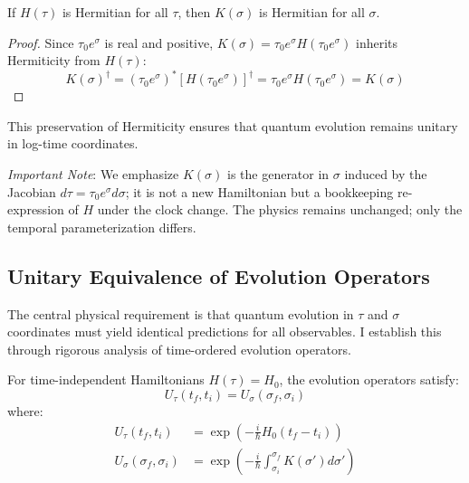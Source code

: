 \begin{corollary}
If $H(\tau)$ is Hermitian for all $\tau$, then $K(\sigma)$ is Hermitian for all $\sigma$.
\end{corollary}

\begin{proof}
Since $\tau_0 e^\sigma$ is real and positive, $K(\sigma) = \tau_0 e^\sigma H(\tau_0 e^\sigma)$ inherits Hermiticity from $H(\tau)$:
\begin{equation}
K(\sigma)^\dagger = (\tau_0 e^\sigma)^* [H(\tau_0 e^\sigma)]^\dagger = \tau_0 e^\sigma H(\tau_0 e^\sigma) = K(\sigma)
\end{equation}
\end{proof}

This preservation of Hermiticity ensures that quantum evolution remains unitary in log-time coordinates.

\emph{Important Note}: We emphasize $K(\sigma)$ is the generator in $\sigma$ induced by the Jacobian $d\tau = \tau_0 e^\sigma d\sigma$; it is not a new Hamiltonian but a bookkeeping re-expression of $H$ under the clock change. The physics remains unchanged; only the temporal parameterization differs.

\subsection{Unitary Equivalence of Evolution Operators}
\label{subsec:unitary_equivalence}

The central physical requirement is that quantum evolution in $\tau$ and $\sigma$ coordinates must yield identical predictions for all observables. I establish this through rigorous analysis of time-ordered evolution operators.

\begin{theorem}
\label{thm:unitary_equiv_constant}
For time-independent Hamiltonians $H(\tau) = H_0$, the evolution operators satisfy:
\begin{equation}
U_\tau(t_f, t_i) = U_\sigma(\sigma_f, \sigma_i)
\end{equation}
where:
\begin{align}
U_\tau(t_f, t_i) &= \exp\left(-\frac{i}{\hbar} H_0 (t_f - t_i)\right) \\
U_\sigma(\sigma_f, \sigma_i) &= \exp\left(-\frac{i}{\hbar} \int_{\sigma_i}^{\sigma_f} K(\sigma') d\sigma'\right)
\end{align}
\end{theorem}

